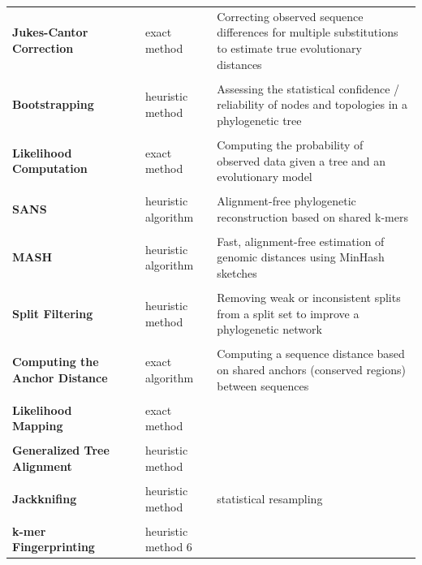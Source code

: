 \begin{table}[H]
 \centering
    \begin{tabular}{p{4cm}p{1cm}p{3cm}p{6cm}}  
    \textbf{Jukes-Cantor Correction} & & exact method & Correcting observed sequence differences for multiple substitutions to estimate true evolutionary distances \\ \\
    \textbf{Bootstrapping} & & heuristic method & Assessing the statistical confidence / reliability of nodes and topologies in a phylogenetic tree \\ \\
    \textbf{Likelihood Computation} & & exact method  & Computing the probability of observed data given a tree and an evolutionary model\\ \\
    \textbf{SANS} & & heuristic algorithm & Alignment-free phylogenetic reconstruction based on shared k-mers \\ \\
    \textbf{MASH} & & heuristic algorithm & Fast, alignment-free estimation of genomic distances using MinHash sketches \\ \\
    \textbf{Split Filtering} & & heuristic method & Removing weak or inconsistent splits from a split set to improve a phylogenetic network \\ \\
    \textbf{Computing the Anchor Distance} && exact algorithm  & Computing a sequence distance based on shared anchors (conserved regions) between sequences\\ \\
   \textbf{Likelihood Mapping} & & exact method \\ \\
   \textbf{Generalized Tree Alignment} & & heuristic method  \\ \\
   \textbf{Jackknifing} & & heuristic method & statistical resampling  \\ \\
   \textbf{k-mer Fingerprinting} & & heuristic method 6 
     \end{tabular}
     
\end{table}

